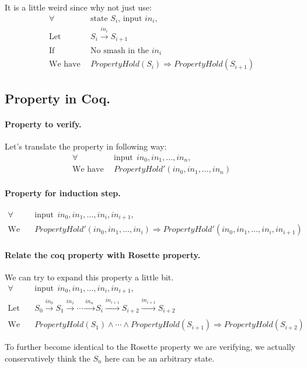 \documentclass{article}
\begin{document}
It is a little weird since why not just use:
\begin{align*}
\forall &~~ \text{state $S_i$, input $in_i$}, \\
\text{Let} &~~ S_i \xrightarrow[]{in_i} S_{i+1} \\
\text{If} &~~ \text{No smash in the $in_i$} \\
\text{We have} &~~ PropertyHold(S_{i}) \Rightarrow PropertyHold(S_{i+1})
\end{align*}






\subsection{Property in Coq.}

\paragraph{Property to verify.}
Let's translate the property in following way:
\begin{align*}
\forall &~~ \text{input} ~~ in_0, in_1, \dots, in_n, \\
\text{We have} &~~ PropertyHold'(in_0, in_1, \dots, in_n)
\end{align*}




\paragraph{Property for induction step.}
\begin{align*}
\forall &~~ \text{input} ~~ in_0, in_1, \dots, in_i, in_{i+1}, \\
\text{We have} &~~ PropertyHold'(in_0, in_1, \dots, in_i) \Rightarrow PropertyHold'(in_0, in_1, \dots, in_i, in_{i+1})
\end{align*}




\paragraph{Relate the coq property with Rosette property.}
We can try to expand this property a little bit.
\begin{align*}
\forall &~~ \text{input} ~~ in_0, in_1, \dots, in_i, in_{i+1}, \\
\text{Let} &~~ S_0 \xrightarrow[]{in_0} S_{1} \xrightarrow[]{in_1} \cdots \xrightarrow[]{in_n} S_{i} \xrightarrow[]{in_{i+1}} S_{i+2} \xrightarrow[]{in_{i+1}} S_{i+2} \\
\text{We have} &~~ PropertyHold(S_{1}) \land \cdots \land PropertyHold(S_{i+1}) \Rightarrow PropertyHold(S_{i+2})
\end{align*}

To further become identical to the Rosette property we are verifying, we actually conservatively think the $S_{n}$ here can be an arbitrary state.








\end{document}
